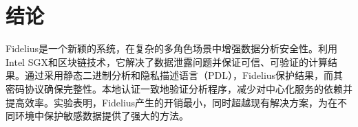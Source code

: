 \section{结论}
Fidelius是一个新颖的系统，在复杂的多角色场景中增强数据分析安全性。利用Intel SGX和区块链技术，它解决了数据泄露问题并保证可信、可验证的计算结果。通过采用静态二进制分析和隐私描述语言（PDL），Fidelius保护结果，而其密码协议确保完整性。本地认证一致地验证分析程序，减少对中心化服务的依赖并提高效率。实验表明，Fidelius产生的开销最小，同时超越现有解决方案，为在不同环境中保护敏感数据提供了强大的方法。 